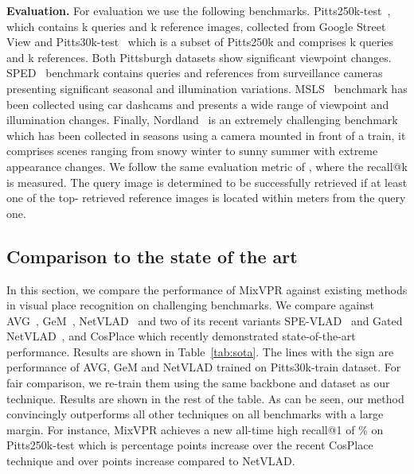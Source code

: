 \documentclass[10pt,twocolumn,letterpaper]{article}
\begin{document}
\noindent\textbf{Evaluation.} For evaluation we use the following  benchmarks. Pitts250k-test~\cite{torii2013visual}, which contains k queries and k reference images, collected from Google Street View and Pitts30k-test~\cite{torii2013visual} which is a subset of Pitts250k and comprises k queries and k references. Both Pittsburgh datasets show significant viewpoint changes. SPED~\cite{zaffar2021vpr} benchmark contains  queries and  references from surveillance cameras presenting significant seasonal and illumination variations. MSLS~\cite{warburg2020mapillary} benchmark has been collected using car dashcams and presents a wide range of viewpoint and illumination changes. Finally, Nordland~\cite{zaffar2021vpr} is an extremely challenging benchmark which has been collected in  seasons using a camera mounted in front of a train, it comprises scenes ranging from snowy winter to sunny summer with extreme appearance changes.
We follow the same evaluation metric of \cite{arandjelovic2016netvlad, kim2017learned, warburg2020mapillary, zaffar2021vpr, wang2022transvpr, berton2022rethinking}, where the recall@k is measured. The query image is determined to be successfully retrieved if at least one of the top- retrieved reference images is located within  meters from the query one.

\subsection{Comparison to the state of the art}

In this section, we compare the performance of MixVPR against existing methods in visual place recognition on  challenging benchmarks. We compare against AVG~\cite{arandjelovic2016netvlad}, GeM~\cite{radenovic2018fine}, NetVLAD~\cite{arandjelovic2016netvlad} and two of its recent variants SPE-VLAD~\cite{yu2019spatial} and Gated NetVLAD~\cite{zhang2021vector}, and CosPlace which recently demonstrated state-of-the-art performance. 
Results are shown  in Table~\ref{tab:sota}. The lines with the sign  are performance of AVG, GeM and NetVLAD  trained on Pitts30k-train dataset. For fair comparison, we re-train them using the same backbone and dataset as our technique. Results are shown in the rest of the table. As can be seen, our method convincingly outperforms all other techniques on all benchmarks with a large margin. For instance, MixVPR achieves a new all-time high recall@1 of \% on Pitts250k-test which is  percentage points increase over the recent CosPlace technique and over  points increase compared to NetVLAD.
\end{document}

